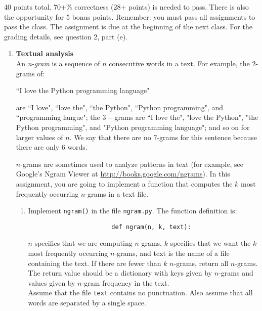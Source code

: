 \documentclass{article}
\newcounter{points}
\begin{document}
\pagestyle{fancy}

40 points total.  70+\% correctness (28+ points) is needed to pass.  There is also the opportunity for 5 bonus points.  Remember: you must pass all assignments to pass the class.  The assignment is due at the beginning of the next class.  For the grading details, see question 2, part (e).

\begin{enumerate}
\item \textbf{Textual analysis} \\
An \emph{n-gram} is a sequence of $n$ consecutive words in a text.  For example, the $2$-grams of:
\begin{center}
 ``I love the Python programming language"
\end{center} are ``I love", ``love the", ``the Python", ``Python programming", and ``programming langue";  the $3-$grams are ``I love the", "love the Python", "the Python programming", and "Python programming language"; and so on for larger values of $n$.  We say that there are no $7$-grams for this sentence because there are only $6$ words.

$n$-grams are sometimes used to analyze patterns in text (for example, see Google's Ngram Viewer at \url{http://books.google.com/ngrams}).  In this assignment, you are going to implement a function that computes the $k$ most frequently occurring $n$-grams in a text file.

\begin{enumerate}
\item Implement \texttt{ngram()} in the file \texttt{ngram.py}.  The function definition is: \\

\begin{lstlisting}
                       def ngram(n, k, text):
\end{lstlisting}
$n$ specifies that we are computing $n$-grams, $k$ specifies that we want the $k$ most frequently occurring $n$-grams, and text is the name of a file containing the text.  If there are fewer than $k$ $n$-grams, return all $n$-grams.  The return value should be a dictionary with keys given by $n$-grams and values given by $n$-gram frequency in the text. \\

Assume that the file \texttt{text} contains no punctuation.  Also assume that all words are separated by a single space. \\


\end{enumerate}
\end{enumerate}
\end{document}
